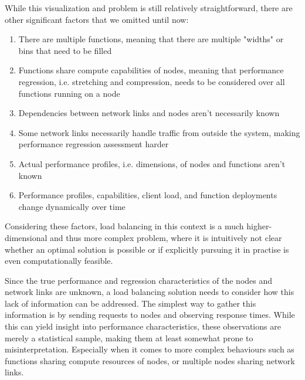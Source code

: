 \documentclass[draft,final]{vutinfth} %
\begin{document}
While this visualization and problem is still relatively straightforward, there are other significant factors that we omitted until now:
\begin{enumerate}
    \item There are multiple functions, meaning that there are multiple "widths" or bins that need to be filled
    \item Functions share compute capabilities of nodes, meaning that performance regression, i.e. stretching and compression, needs to be considered over all functions running on a node
    \item Dependencies between network links and nodes aren't necessarily known
    \item Some network links necessarily handle traffic from outside the system, making performance regression assessment harder
    \item Actual performance profiles, i.e. dimensions, of nodes and functions aren't known
    \item Performance profiles, capabilities, client load, and function deployments change dynamically over time
\end{enumerate}

Considering these factors, load balancing in this context is a much higher-dimensional and thus more complex problem, where it is intuitively not clear whether an optimal solution is possible or if explicitly pursuing it in practise is even computationally feasible.


Since the true performance and regression characteristics of the nodes and network links are unknown, a load balancing solution needs to consider how this lack of information can be addressed. 
The simplest way to gather this information is by sending requests to nodes and observing response times. While this can yield insight into performance characteristics, these observations are merely a statistical sample, making them at least somewhat prone to misinterpretation. Especially when it comes to more complex behaviours such as functions sharing compute resources of nodes, or multiple nodes sharing network links.
\end{document}
